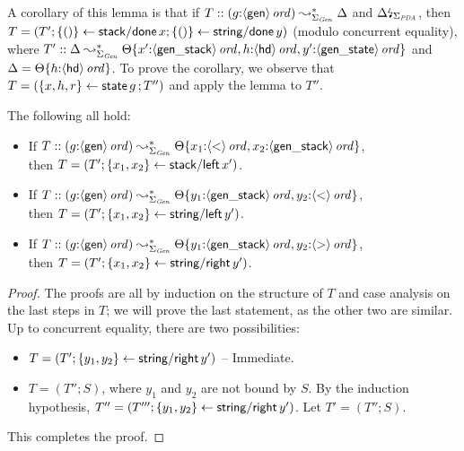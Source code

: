 A corollary of this lemma is that if 
$T :: (g{:}{\langle {\sf gen} \rangle}\,{{\it ord}}) \leadsto^*_{\Sigma_{\it Gen}} \Delta$ and
  ${\Delta}{\mbox{\lightning}}_{\Sigma_{\it PDA}}$, then $T = (T';
  \{{()}\} \leftarrow {{\sf stack/done}\,x}; \{{()}\} \leftarrow {{\sf
      string/done}\,y})$ (modulo concurrent equality), where $T' ::
  \Delta \leadsto^*_{\Sigma_{\it Gen}}
  {\Theta}\{{x'{:}{\langle {\sf gen\_stack} \rangle}\,{{\it ord}},
    h{:}{\langle {\sf hd} \rangle}\,{{\it ord}}, y'{:}{\langle {\sf gen\_state} \rangle}\,{{\it ord}}}\}$
  and $\Delta = {\Theta}\{{h{:}{\langle {\sf hd} \rangle}\,{{\it ord}}}\}$. To prove
the corollary, we observe
that $T = (\{{x,h,r}\} \leftarrow {{\sf state}\,g\,}; T'')$ and apply the lemma
to $T''$. 

\bigskip
\begin{lemma} The following all hold:
\begin{itemize}
\item If $T :: (g{:}{\langle {\sf gen} \rangle}\,{{\it ord}}) \leadsto^*_{\Sigma_{\it Gen}} 
       {\Theta}\{{x_1{:}{\langle {\sf <} \rangle}\,{{\it ord}}, 
          x_2{:}{\langle {\sf gen\_stack} \rangle}\,{{\it ord}}}\}$, \\then 
$T = (T'; \{{x_1,x_2}\} \leftarrow {{\sf stack/left}\,x'})$. 
\item If $T :: (g{:}{\langle {\sf gen} \rangle}\,{{\it ord}}) \leadsto^*_{\Sigma_{\it Gen}} 
       {\Theta}\{{y_1{:}{\langle {\sf gen\_stack} \rangle}\,{{\it ord}},
           y_2{:}{\langle {\sf <} \rangle}\,{{\it ord}}}\}$, \\then 
$T = (T'; \{{x_1,x_2}\} \leftarrow {{\sf string/left}\,y'})$. 
\item If $T :: (g{:}{\langle {\sf gen} \rangle}\,{{\it ord}}) \leadsto^*_{\Sigma_{\it Gen}} 
       {\Theta}\{{y_1{:}{\langle {\sf gen\_stack} \rangle}\,{{\it ord}},
           y_2{:}{\langle {\sf >} \rangle}\,{{\it ord}}}\}$, \\then 
$T = (T'; \{{x_1,x_2}\} \leftarrow {{\sf string/right}\,y'})$. 
\end{itemize}
\end{lemma}
\begin{proof}
The proofs are all by induction on the structure of $T$ and case
analysis on the last steps in $T$; we will prove the last statement, as
the other two are similar. Up to concurrent equality, there are two
possibilities:
\begin{itemize}
\item $T = (T'; \{{y_1, y_2}\} \leftarrow {{\sf string/right}\,y'})$ -- Immediate.
\item $T = (T''; S)$, where $y_1$ and $y_2$ are not bound by $S$. By the 
induction hypothesis, $T'' = (T'''; \{{y_1,y_2}\} \leftarrow {{\sf string/right}\,y'})$.
Let $T' = (T''; S)$. 
\end{itemize}
This completes the proof. 
\end{proof}

